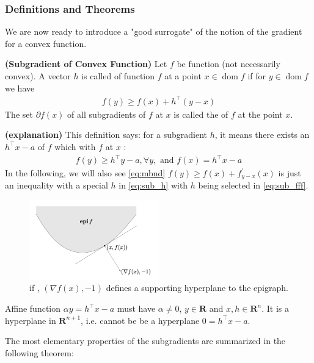 \documentclass{article}
\newcommand{\bfs}[1]{\textbf{({#1}) }}
\newcommand{\dom}{\operatorname{dom}}
\begin{document}
\subsubsection{Definitions and Theorems}
We are now ready to introduce a "good surrogate" of the notion of the gradient for a convex function. 
\begin{defa}\bfs{Subgradient of Convex Function}
 Let $f$ be function (not necessarily convex). A vector $h$ is called  of function $f$ at a point $x \in \dom f$ if for  $y \in \dom f$ we have
\begin{align}
f(y) \geq f(x)+h^{\top}(y-x)\label{eq:sub_h}
\end{align}
The set $\partial f(x)$ of all subgradients of $f$ at $x$ is called the  of $f$ at the point $x$. 
\end{defa}
\begin{rema}\bfs{explanation}
This definition says: for a subgradient $h$, it means there exists an  $h^{\top} x-a$ of $f$ which  with $f$ at $x$ :
\begin{align*}
f(y) \geq h^{\top} y-a , \forall y, \text{ and } f(x)=h^{\top} x-a
\end{align*}
In the following, we will also see \cref{eq:mbnd} $f(y) \geq f(x)+f_{y-x}^{\prime}(x)$ is just an inequality with a special $h$ in \cref{eq:sub_h} with $h$ being selected in \cref{eq:sub_fff}.
\end{rema}
\begin{figure}
    \centering
    \includegraphics[width=0.5\textwidth]{Figs/6.png}
    \caption{if , $(\nabla f(x),-1)$ defines a supporting hyperplane to the epigraph.}
    \label{fig:supp_conx1}
\end{figure}
\begin{rema}
Affine function $\alpha y=h^{\top} x-a$ must have $\alpha\ne 0$, $y\in \mathbf{R}$ and $x,h\in\mathbf{R}^n$. It is a  hyperplane in $\mathbf{R}^{n+1}$, i.e. cannot be be a hyperplane $0=h^{\top} x-a$.
\end{rema}
The most elementary properties of the subgradients are summarized in the following theorem:
\end{document}
